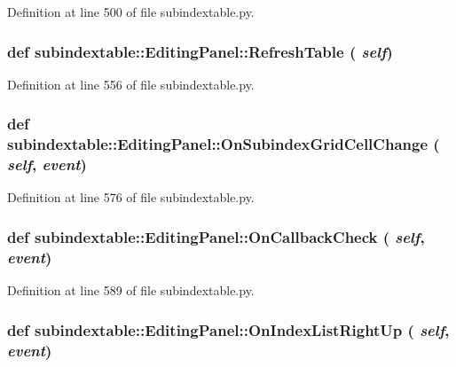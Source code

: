 Definition at line 500 of file subindextable.py.\hypertarget{classsubindextable_1_1EditingPanel_1dbdf790003c72bd91bc274308023697}{
\subsubsection[RefreshTable]{\setlength{\rightskip}{0pt plus 5cm}def subindextable::Editing\-Panel::Refresh\-Table ( {\em self})}}
\label{classsubindextable_1_1EditingPanel_1dbdf790003c72bd91bc274308023697}




Definition at line 556 of file subindextable.py.\hypertarget{classsubindextable_1_1EditingPanel_77b31fc20f2e231fc7fa4d21932f6ece}{
\subsubsection[OnSubindexGridCellChange]{\setlength{\rightskip}{0pt plus 5cm}def subindextable::Editing\-Panel::On\-Subindex\-Grid\-Cell\-Change ( {\em self},  {\em event})}}
\label{classsubindextable_1_1EditingPanel_77b31fc20f2e231fc7fa4d21932f6ece}




Definition at line 576 of file subindextable.py.\hypertarget{classsubindextable_1_1EditingPanel_25f67e5b35c3e64b67a5f92efc3e72fc}{
\subsubsection[OnCallbackCheck]{\setlength{\rightskip}{0pt plus 5cm}def subindextable::Editing\-Panel::On\-Callback\-Check ( {\em self},  {\em event})}}
\label{classsubindextable_1_1EditingPanel_25f67e5b35c3e64b67a5f92efc3e72fc}




Definition at line 589 of file subindextable.py.\hypertarget{classsubindextable_1_1EditingPanel_ea60ec2e247df3ded2be05ad4f647d32}{
\subsubsection[OnIndexListRightUp]{\setlength{\rightskip}{0pt plus 5cm}def subindextable::Editing\-Panel::On\-Index\-List\-Right\-Up ( {\em self},  {\em event})}}
\label{classsubindextable_1_1EditingPanel_ea60ec2e247df3ded2be05ad4f647d32}




